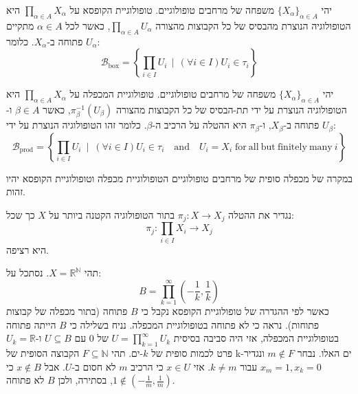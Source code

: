 \documentclass{tstextbook}
\begin{document}
\begin{definition}
יהי \(\{X_\alpha\}_{\alpha\in A}\) משפחה של מרחבים טופולוגיים. טופולוגיית הקופסא על \(\prod_{\alpha\in A} X_\alpha\) היא הטופולוגיה הנוצרת מהבסיס של כל הקבוצות מהצורה \(\prod_{\alpha\in A} U_\alpha\), כאשר לכל \(\alpha\in A\) מתקיים \(U_\alpha\) פתוחה ב-\(X_\alpha\). כלומר:
$${\mathcal{B}}_{\mathrm{box}}=\left\{\prod_{i\in I}U_{i}\,\mid\,\left(\forall i\in I\right)U_{i}\in\tau_{i}\right\}$$

\end{definition}
\begin{definition}
יהי \(\{X_\alpha\}_{\alpha\in A}\) משפחה של מרחבים טופולוגיים. טופולוגיית המכפלה על \(\prod_{\alpha\in A} X_\alpha\) היא הטופולוגיה הנוצרת על ידי תת-הבסיס של כל הקבוצות מהצורה \(\pi_\beta^{-1}(U_\beta)\), כאשר \(\beta\in A\) ו-\(U_\beta\) פתוחה ב-\(X_\beta\), ו-\(\pi_\beta\) היא ההטלה על הרכיב ה-\(\beta\). כלומר זהו הטופולוגיה הנוצרת על ידי:
$${\mathcal{B}}_{\mathrm{prod}}=\left\{\prod_{i\in I}U_{i}\ \mid\ \left(\forall i\in I\right)U_{i}\in\tau_{i}\quad{\mathrm{and}}\quad U_{i}=X_{i}\;{\mathrm{for~all~but~finitely~many~}}i\right\}$$

\end{definition}
\begin{remark}
במקרה של מכפלה סופית של מרחבים טופולוגיים הטופולוגיית מכפלה וטופולוגיית הקופסא יהיו זהות.

\end{remark}
\begin{proposition}
נגדיר את ההטלה \(\pi_{j}:X\to X_{j}\) בתור הטופולוגיה הקטנה ביותר על \(X\) כך שכל:
$$\pi_{j}\colon\prod_{i\in I}X_{i}\to X_{j}$$
היא רציפה.

\end{proposition}
\begin{example}
תהי \(X=\mathbb{R}^{\mathbb{N}}\). נסתכל על:
$$B=\prod_{k=1}^{\infty}\left(-{\frac{1}{k}},{\frac{1}{k}}\right)$$
כאשר לפי ההגדרה של טופולוגיית הקופסא נקבל כי \(B\) פתוחה (בתור מכפלה של קבוצות פתוחות). נראה כי לא פתוחה בטופולוגיית המכפלה. נניח בשלילה כי \(B\) הייתה פתוחה בטופולוגיית המכפלה, אזי היה סביבה בסיסית \(U=\prod_{k=1}^{\infty}U_{k}\) של \(0\) עם \(U\subseteq B\) ו-\(U_{k}=\mathbb{R}\) פרט לכמות סופית של \(k\)-ים. תהי \(F\subseteq \mathbb{N}\) הקבוצה הסופית של k-ים האלו. נבחר \(m \not \in F\) ונגדיר \(x_{m}=1,x_{k}=0\) עבור \(k\neq m\). אזי \(x \in U\) כי הרכיב \(m\) לא חסום ב-\(U\). אבל \(x \not \in B\) כי \(1 \not \in \left( -\frac{1}{m},\frac{1}{m} \right)\), בסתירה, ולכן \(B\) לא פתוחה.

\end{example}
\end{document}
